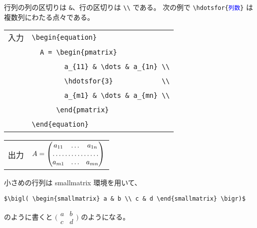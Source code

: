 行列の列の区切りは \verb`&`、行の区切りは \verb`\\` である。
次の例で \verb`\hdotsfor{`\texttt{\textcolor{blue}{列数}}\verb`}` は複数列にわたる点々である。
\begin{longtable}[l]{@{}l|l@{}}
  入力 & \verb`\begin{equation}`                   \\
  \    & \verb`  A = \begin{pmatrix}`              \\
  \    & \verb`        a_{11} & \dots & a_{1n} \\` \\
  \    & \verb`        \hdotsfor{3}            \\` \\
  \    & \verb`        a_{m1} & \dots & a_{mn} \\` \\
  \    & \verb`      \end{pmatrix}`                \\
  \    & \verb`\end{equation}`                     \\
\end{longtable}
\begin{longtable}[l]{@{}l|l@{}}
  出力 & $\displaystyle{A = \begin{pmatrix} a_{11} & \dots & a_{1n} \\ \hdotsfor{3} \\ a_{m1} & \dots & a_{mn} \\ \end{pmatrix}}$ \\
\end{longtable}
小さめの行列は smallmatrix 環境を用いて、
\begin{mdframed}[roundcorner=0.50zw,leftmargin=3.00zw,rightmargin=3.00zw,skipabove=0.40zw,skipbelow=0.40zw,innertopmargin=4.00pt,innerbottommargin=4.00pt,innerleftmargin=5.00pt,innerrightmargin=5.00pt,linecolor=gray!020,linewidth=0.50pt,backgroundcolor=gray!20]
\begin{verbatim}
$\bigl( \begin{smallmatrix} a & b \\ c & d \end{smallmatrix} \bigr)$
\end{verbatim}
\end{mdframed}
のように書くと $\bigl( \begin{smallmatrix} a & b \\ c & d \end{smallmatrix} \bigr)$ のようになる。\\

